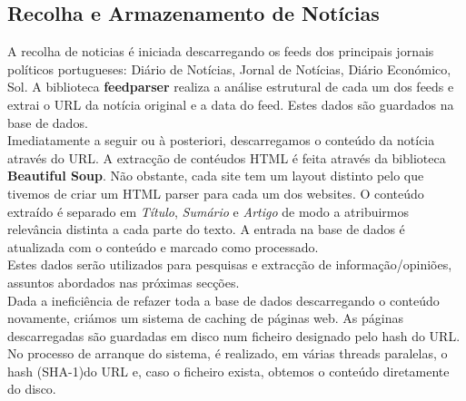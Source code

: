 \subsection{Recolha e Armazenamento de Notícias}
\label{sec:news_storage}
\hspace{15pt}A recolha de noticias é iniciada descarregando os feeds dos principais jornais políticos portugueses: Diário de Notícias, Jornal de Notícias, Diário Económico, Sol. A biblioteca \textbf{feedparser} realiza a análise estrutural de cada um dos  feeds e extrai o URL da notícia original e a data do feed. Estes dados são guardados na base de dados.\\
Imediatamente a seguir ou à posteriori, descarregamos o conteúdo da notícia através do URL. A extracção de contéudos HTML é feita através da biblioteca \textbf{Beautiful Soup}. Não obstante, cada site tem um layout distinto pelo que tivemos de criar um HTML parser para cada um dos websites. O conteúdo extraído é separado em \textit{Título}, \textit{Sumário} e \textit{Artigo} de modo a atribuirmos relevância distinta a cada parte do texto. A entrada na base de dados é atualizada com o conteúdo e marcado como processado.\\
Estes dados serão utilizados para pesquisas e  extracção de informação/opiniões, assuntos abordados nas próximas secções.\\
Dada a ineficiência de refazer toda a base de dados descarregando o conteúdo novamente, criámos um sistema de caching de páginas web. As páginas descarregadas são guardadas em disco num ficheiro designado pelo hash do URL. No processo de arranque do sistema, é realizado, em várias threads paralelas, o hash (SHA-1)do URL e, caso o ficheiro exista, obtemos o conteúdo diretamente do disco.